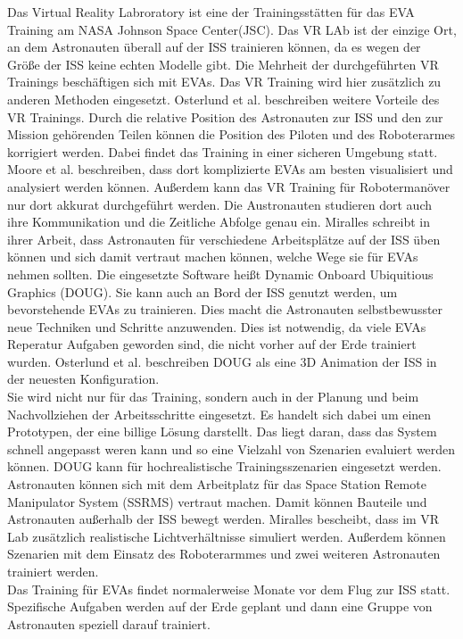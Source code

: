 Das Virtual Reality Labroratory ist eine der Trainingsstätten für das EVA Training am NASA Johnson Space Center(JSC). \cite{moore201021st}
Das VR LAb ist der einzige Ort, an dem Astronauten überall auf der ISS trainieren können, da es wegen der Größe der ISS keine echten Modelle gibt.
Die Mehrheit der durchgeführten VR Trainings beschäftigen sich mit EVAs.
Das VR Training wird hier zusätzlich zu anderen Methoden eingesetzt. \cite{osterlund2012virtual}
Osterlund et al. beschreiben weitere Vorteile des VR Trainings.
Durch die relative Position des Astronauten zur ISS und den zur Mission gehörenden Teilen können die Position des Piloten und des Roboterarmes korrigiert werden.
Dabei findet das Training in einer sicheren Umgebung statt. \cite{osterlund2012virtual}
\\
Moore et al. beschreiben, dass dort komplizierte EVAs am besten visualisiert und analysiert werden können. Außerdem kann das VR Training für Robotermanöver nur dort akkurat durchgeführt werden.
Die Austronauten studieren dort auch ihre Kommunikation und die Zeitliche Abfolge genau ein. \cite{moore201021st}
Miralles schreibt in ihrer Arbeit, dass Astronauten für verschiedene Arbeitsplätze auf der ISS üben können und sich damit vertraut machen können, welche Wege sie für EVAs nehmen sollten. \cite{miralles2013onboard}
Die eingesetzte Software heißt Dynamic Onboard Ubiquitious Graphics (DOUG). Sie kann auch an Bord der ISS genutzt werden, um bevorstehende EVAs zu trainieren. Dies macht die Astronauten selbstbewusster neue Techniken und Schritte anzuwenden. \cite{osterlund2012virtual}
Dies ist notwendig, da viele EVAs Reperatur Aufgaben geworden sind, die nicht vorher auf der Erde trainiert wurden.\cite{miralles2013onboard}
Osterlund et al. beschreiben DOUG als eine 3D Animation der ISS in der neuesten Konfiguration.
\\
Sie wird nicht nur für das Training, sondern auch in der Planung und beim Nachvollziehen der Arbeitsschritte eingesetzt.
Es handelt sich dabei um einen Prototypen, der eine billige Lösung darstellt.  \cite{osterlund2012virtual}
Das liegt daran, dass das System schnell angepasst weren kann und so eine Vielzahl von Szenarien evaluiert werden können.
DOUG kann für hochrealistische Trainingsszenarien eingesetzt werden. \cite{miralles2013onboard}
Astronauten können sich mit dem Arbeitplatz für das Space Station Remote Manipulator System (SSRMS) vertraut machen. Damit können Bauteile und Astronauten außerhalb der ISS bewegt werden.\cite{garcia2020training}
Miralles bescheibt, dass im VR Lab zusätzlich realistische Lichtverhältnisse simuliert werden.
Außerdem können Szenarien mit dem Einsatz des Roboterarmmes und zwei weiteren Astronauten trainiert werden. \cite{miralles2013onboard}
\\
Das Training für EVAs findet normalerweise Monate vor dem Flug zur ISS statt. Spezifische Aufgaben werden auf der Erde geplant und dann eine Gruppe von Astronauten speziell darauf trainiert. \cite{garcia2020training}